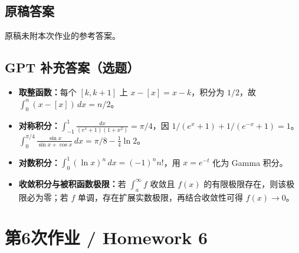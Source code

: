 \documentclass[UTF8,11pt, a4paper, oneside, fontset=none]{ctexbook}
\begin{document}
\subsection*{原稿答案}
\noindent 原稿未附本次作业的参考答案。
\clearpage
\subsection*{GPT 补充答案（选题）}
\begin{itemize}
\item \textbf{取整函数：}每个 $[k,k+1]$ 上 $x-[x]=x-k$，积分为 $1/2$，故 $\int_0^n(x-[x])\,dx=n/2$。
\item \textbf{对称积分：}$\int_{-1}^1\!\frac{dx}{(e^x+1)(1+x^2)}=\pi/4$，因 $1/(e^x+1)+1/(e^{-x}+1)=1$。$\int_0^{\pi/4}\!\frac{\sin x}{\sin x+\cos x}\,dx=\pi/8-\tfrac14\ln2$。
\item \textbf{对数积分：}$\int_0^1(\ln x)^n\,dx=(-1)^n n!$，用 $x=e^{-t}$ 化为 Gamma 积分。
\item \textbf{收敛积分与被积函数极限：}若 $\int_a^\infty f$ 收敛且 $f(x)$ 的有限极限存在，则该极限必为零；若 $f$ 单调，存在扩展实数极限，再结合收敛性可得 $f(x)\to0$。
\end{itemize}
\clearpage
\section{第6次作业 / Homework 6}
\end{document}
